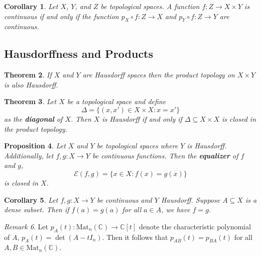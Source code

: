 \documentclass[ 12pt ]{article}
\newcounter{lecture_num}
\theoremstyle{plain}
\theoremstyle{plain}
\newtheorem{theorem}{Theorem}[lecture_num]
\newtheorem{proposition}[theorem]{Proposition}
\newtheorem{corollary}[theorem]{Corollary}
\theoremstyle{definition}
\theoremstyle{remark}
\newtheorem{remark}[theorem]{Remark}
\begin{document}
\begin{corollary}
	Let $X$, $Y$, and $Z$ be topological spaces. A function $f : Z \to X \times Y$ is continuous if and only if the function $p_X \circ f : Z \to X$ and $p_Y \circ f : Z \to Y$ are
	continuous.
\end{corollary}

\subsection*{Hausdorffness and Products}

\begin{theorem}
	If $X$ and $Y$ are Hausdorff spaces then the product topology on $X \times Y$ is also Hausdorff.
\end{theorem}

\begin{theorem}
	Let $X$ be a topological space and define $$\Delta = \{ (x, x') \in X \times X : x = x' \}$$ as the \textbf{diagonal} of $X$. Then $X$ is Hausdorff if and only if $\Delta \subseteq X
	\times X$ is closed in the product topology.
\end{theorem}

\begin{proposition}
	Let $X$ and $Y$ be topological spaces where $Y$ is Hausdorff. Additionally, let $f, g : X \to Y$ be continuous functions. Then the \textbf{equalizer} of $f$ and $g$, $$\mathcal{E}(f,
	g) = \{ x \in X : f(x) = g(x) \}$$ is closed in $X$.
\end{proposition}

\begin{corollary}
	Let $f, g : X \to Y$ be continuous and $Y$ Hausdorff. Suppose $A \subseteq X$ is a dense subset. Then if $f(a) = g(a)$ for all $a \in A$, we have $f = g$.
\end{corollary}

\begin{remark}
	Let $p_A(t) : \mathrm{Mat}_n(\mathbb{C}) \to \mathbb{C}[t]$ denote the characteristic polynomial of $A$, $p_A(t) = \det(A - tI_n)$. Then it follows that $p_{AB}(t) = p_{BA}(t)$ for
	all $A, B \in \mathrm{Mat}_n(\mathbb{C})$.
\end{remark}
\end{document}
